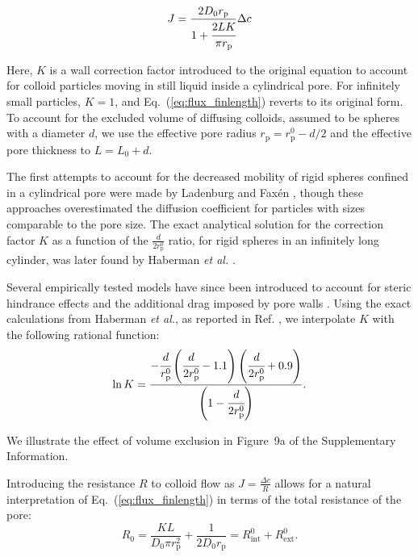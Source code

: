 \documentclass[12pt, a4paper]{article}
\begin{document}
\begin{equation}
    J = \frac{2 D_0 r_{\text{p}}}{1 + \cfrac{2L K}{\pi r_{\text{p}}}} \Delta c
    \label{eq:flux_finlength}
\end{equation}

Here, $K$ is a wall correction factor introduced to the original equation to account for colloid particles moving in still liquid inside a cylindrical pore. For infinitely small particles, $K = 1$, and Eq.~(\ref{eq:flux_finlength}) reverts to its original form. 
To account for the excluded volume of diffusing colloids, assumed to be spheres with a diameter $d$, we use the effective pore radius $r_{\text{p}} = r_{\text{p}}^{0} - d/2$ and the effective pore thickness to $L = L_{0} + d$.

The first attempts to account for the decreased mobility of rigid spheres confined in a cylindrical pore were made by Ladenburg \cite{Ladenburg1907} and Fax\'en \cite{Faxen1922}, though these approaches overestimated the diffusion coefficient for particles with sizes comparable to the pore size. The exact analytical solution for the correction factor $K$ as a function of the $\frac{d}{2 r_{\text{p}}^{0}}$ ratio, for rigid spheres in an infinitely long cylinder, was later found by Haberman \emph{et al.} \cite{Haberman1958}. 

Several empirically tested models have since been introduced to account for steric hindrance effects and the additional drag imposed by pore walls \cite{Renkin1954, Beck1970, Bungay1973, Anderson1974, Brenner1977}. Using the exact calculations from Haberman \emph{et al.}, as reported in Ref. \cite{Paine1975}, we interpolate $K$ with the following rational function:
\begin{equation}
    \ln K = \frac{- \cfrac{d}{r_{\text{p}}^{0}} \left(\cfrac{d}{2 r_{\text{p}}^{0}}-1.1\right) \left(\cfrac{d}{2 r_{\text{p}}^{0}}+0.9\right)}{\left(1-\cfrac{d}{2 r_{\text{p}}^{0}}\right)}.
\end{equation}

We illustrate the effect of volume exclusion in Figure~9a of the Supplementary Information.

Introducing the resistance $R$ to colloid flow as $J = \frac{\Delta c}{R}$ allows for a natural interpretation of Eq.~(\ref{eq:flux_finlength}) in terms of the total resistance of the pore:
\begin{equation}
    R_{0} = \frac{KL}{D_0 \pi r_{\text{p}}^{2}} + \frac{1}{2 D_0 r_{\text{p}}} = R_{\text{int}}^{0} + R_{\text{ext}}^{0}.
    \label{eq:resistance}
\end{equation}
\end{document}
